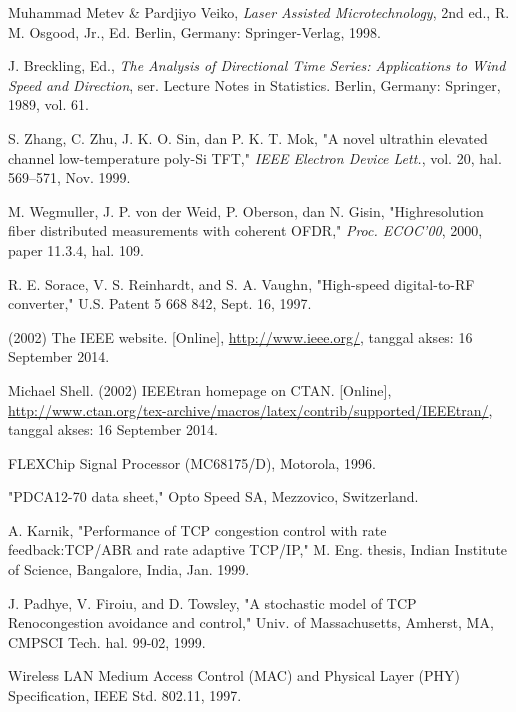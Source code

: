 \documentclass[10pt,twocolumn]{article}
\begin{document}

\begin{thebibliography}{99}
\eightp
{}
Muhammad Metev \& Pardjiyo Veiko, \textit{Laser Assisted Microtechnology}, 2nd ed., R. M. Osgood, Jr., Ed. Berlin, Germany: Springer-Verlag, 1998.

J. Breckling, Ed., \textit{The Analysis of Directional Time Series: Applications to Wind Speed and Direction}, ser. Lecture Notes in Statistics. Berlin, Germany: Springer, 1989, vol. 61.

S. Zhang, C. Zhu, J. K. O. Sin, dan P. K. T. Mok, "A novel ultrathin elevated channel low-temperature poly-Si TFT," \textit{IEEE Electron Device Lett.}, vol. 20, hal. 569--571, Nov. 1999.

M. Wegmuller, J. P. von der Weid, P. Oberson, dan N. Gisin, "Highresolution fiber distributed measurements with coherent OFDR," \textit{Proc. ECOC'00}, 2000, paper 11.3.4, hal. 109.

R. E. Sorace, V. S. Reinhardt, and S. A. Vaughn, "High-speed digital-to-RF converter," U.S. Patent 5 668 842, Sept. 16, 1997.

(2002) The IEEE website. [Online], \url{http://www.ieee.org/}, tanggal akses: 16 September 2014.

Michael Shell. (2002) IEEEtran homepage on CTAN. [Online], \url{http://www.ctan.org/tex-archive/macros/latex/contrib/supported/IEEEtran/}, tanggal akses: 16 September 2014.

FLEXChip Signal Processor (MC68175/D), Motorola, 1996.

"PDCA12-70 data sheet," Opto Speed SA, Mezzovico, Switzerland.

A. Karnik, "Performance of TCP congestion control with rate feedback:TCP/ABR and rate adaptive TCP/IP," M. Eng. thesis, Indian Institute of Science, Bangalore, India, Jan. 1999.

J. Padhye, V. Firoiu, and D. Towsley, "A stochastic model of TCP Renocongestion avoidance and control," Univ. of Massachusetts, Amherst, MA, CMPSCI Tech. hal. 99-02, 1999.

Wireless LAN Medium Access Control (MAC) and Physical Layer (PHY) Specification, IEEE Std. 802.11, 1997.

\end{thebibliography}
\end{document}
